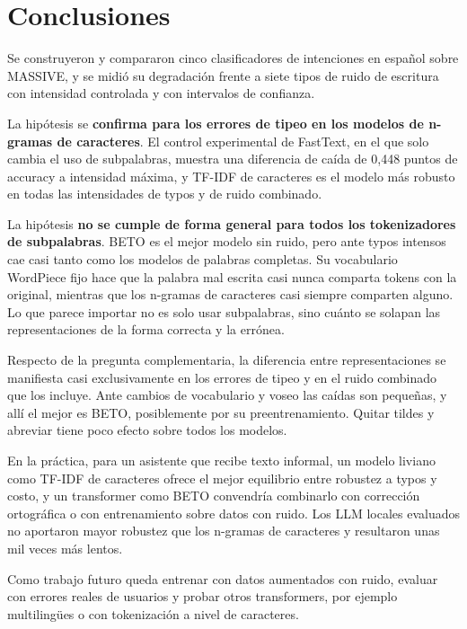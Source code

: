 \documentclass[11pt,a4paper]{article}
\begin{document}
\section{Conclusiones}

Se construyeron y compararon cinco clasificadores de intenciones en español sobre MASSIVE, y se
midió su degradación frente a siete tipos de ruido de escritura con intensidad controlada y
con intervalos de confianza.

La hipótesis se \textbf{confirma para los errores de tipeo en los modelos de n-gramas de
caracteres}. El control experimental de FastText, en el que solo cambia el uso de subpalabras,
muestra una diferencia de caída de 0,448 puntos de accuracy a intensidad máxima, y TF-IDF de
caracteres es el modelo más robusto en todas las intensidades de typos y de ruido combinado.

La hipótesis \textbf{no se cumple de forma general para todos los tokenizadores de
subpalabras}. BETO es el mejor modelo sin ruido, pero ante typos intensos cae casi tanto como
los modelos de palabras completas. Su vocabulario WordPiece fijo hace que la palabra mal
escrita casi nunca comparta tokens con la original, mientras que los n-gramas de caracteres
casi siempre comparten alguno. Lo que parece importar no es solo usar subpalabras, sino cuánto
se solapan las representaciones de la forma correcta y la errónea.

Respecto de la pregunta complementaria, la diferencia entre representaciones se manifiesta
casi exclusivamente en los errores de tipeo y en el ruido combinado que los incluye. Ante
cambios de vocabulario y voseo las caídas son pequeñas, y allí el mejor es BETO, posiblemente
por su preentrenamiento. Quitar tildes y abreviar tiene poco efecto sobre todos los modelos.

En la práctica, para un asistente que recibe texto informal, un modelo liviano como TF-IDF de
caracteres ofrece el mejor equilibrio entre robustez a typos y costo, y un transformer como
BETO convendría combinarlo con corrección ortográfica o con entrenamiento sobre datos con
ruido. Los LLM locales evaluados no aportaron mayor robustez que los n-gramas de caracteres y
resultaron unas mil veces más lentos.

Como trabajo futuro queda entrenar con datos aumentados con ruido, evaluar con errores reales
de usuarios y probar otros transformers, por ejemplo multilingües o con tokenización a nivel
de caracteres.

\nocite{*}
\printbibliography[title={Bibliografía}]
\end{document}
